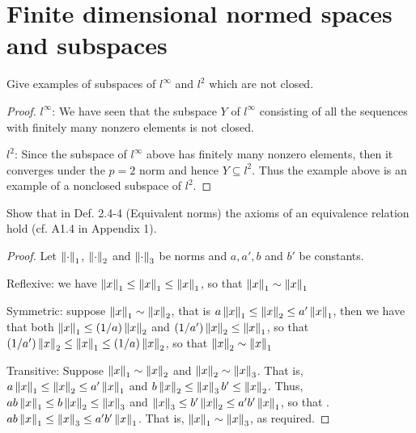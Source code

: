 \section{Finite dimensional normed spaces and subspaces}


\begin{exercise}{1}
Give examples of subspaces of $l^\infty$ and $l^2$ which are not closed.
\end{exercise}
\begin{proof}
$l^\infty$: We have seen that the subspace $Y$ of $l^\infty$ consisting of all the sequences with finitely many nonzero elements is not closed.

$l^2$: Since the subspace of $l^\infty$ above has finitely many nonzero elements, then it converges under the $p=2$ norm and hence $Y\subseteq l^2$. Thus the example above is an example of a nonclosed subspace of $l^2$.
\end{proof}

\begin{exercise}{3}
Show that in Def. 2.4-4 (Equivalent norms) the axioms of an equivalence relation hold (cf. A1.4 in Appendix 1).
\end{exercise}
\begin{proof}
Let $\left\lVert \cdot\right\rVert_1$, $\left\lVert \cdot\right\rVert_2$ and $\left\lVert \cdot\right\rVert_3$ be norms and $a,a',b$ and $b'$ be constants.

Reflexive: we have $\left\lVert x\right\rVert_1 \leq\left\lVert x\right\rVert_1 \leq \left\lVert x\right\rVert_1$, so that $\left\lVert x\right\rVert_1\sim \left\lVert x\right\rVert_1$

Symmetric: suppose $\left\lVert x\right\rVert_1\sim \left\lVert x\right\rVert_2$, that is $a\left\lVert x\right\rVert_1 \leq\left\lVert x\right\rVert_2 \leq a'\left\lVert x\right\rVert_1$, then we have that both $\left\lVert x\right\rVert_1\leq (1/a)\left\lVert x\right\rVert_2$ and $(1/a')\left\lVert x\right\rVert_2 \leq \left\lVert x\right\rVert_1$, so that $(1/a')\left\lVert x\right\rVert_2 \leq\left\lVert x\right\rVert_1 \leq (1/a)\left\lVert x\right\rVert_2$, so that $\left\lVert x\right\rVert_2 \sim \left\lVert x\right\rVert_1$

Transitive: Suppose $\left\lVert x\right\rVert_1\sim \left\lVert x\right\rVert_2$ and $\left\lVert x\right\rVert_2 \sim \left\lVert x\right\rVert_3$. That is, $a\left\lVert x\right\rVert_1 \leq \left\lVert x\right\rVert_2 \leq a'\left\lVert x\right\rVert_1$ and $b\left\lVert x\right\rVert_2 \leq \left\lVert x\right\rVert_3 b'\leq \left\lVert x\right\rVert_2$. Thus, $ab\left\lVert x\right\rVert_1 \leq b\left\lVert x\right\rVert_2 \leq \left\lVert x\right\rVert_3$ and $\left\lVert x\right\rVert_3 \leq b'\left\lVert x\right\rVert_2 \leq a'b'\left\lVert x\right\rVert_1$, so that . $ab\left\lVert x\right\rVert_1 \leq \left\lVert x\right\rVert_3 \leq a'b'\left\lVert x\right\rVert_1$. That is, $\left\lVert x\right\rVert_1\sim\left\lVert x\right\rVert_3$, as required.
\end{proof}

